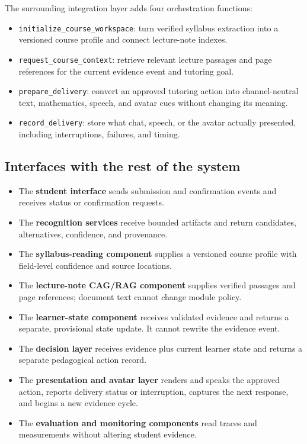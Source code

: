 \documentclass[11pt]{article}
\begin{document}
The surrounding integration layer adds four orchestration functions:

\begin{itemize}
    \item \texttt{initialize\_course\_workspace}: turn verified syllabus extraction into a versioned course profile and connect lecture-note indexes.
    \item \texttt{request\_course\_context}: retrieve relevant lecture passages and page references for the current evidence event and tutoring goal.
    \item \texttt{prepare\_delivery}: convert an approved tutoring action into channel-neutral text, mathematics, speech, and avatar cues without changing its meaning.
    \item \texttt{record\_delivery}: store what chat, speech, or the avatar actually presented, including interruptions, failures, and timing.
\end{itemize}

\subsection{Interfaces with the rest of the system}

\begin{itemize}
    \item The \textbf{student interface} sends submission and confirmation events and receives status or confirmation requests.
    \item The \textbf{recognition services} receive bounded artifacts and return candidates, alternatives, confidence, and provenance.
    \item The \textbf{syllabus-reading component} supplies a versioned course profile with field-level confidence and source locations.
    \item The \textbf{lecture-note CAG/RAG component} supplies verified passages and page references; document text cannot change module policy.
    \item The \textbf{learner-state component} receives validated evidence and returns a separate, provisional state update. It cannot rewrite the evidence event.
    \item The \textbf{decision layer} receives evidence plus current learner state and returns a separate pedagogical action record.
    \item The \textbf{presentation and avatar layer} renders and speaks the approved action, reports delivery status or interruption, captures the next response, and begins a new evidence cycle.
    \item The \textbf{evaluation and monitoring components} read traces and measurements without altering student evidence.
\end{itemize}
\end{document}
